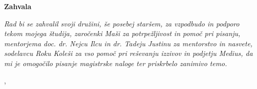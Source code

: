 \thispagestyle{empty}

\begin{center}
{\Large \textbf{\sc Zahvala}}
\end{center}
\vspace{0.5cm}

{\it\noindent
Rad bi se zahvalil svoji družini, še posebej staršem, za vzpodbudo in podporo tekom mojega študija, zaročenki Maši za potrpežljivost in pomoč pri pisanju, mentorjema doc. dr. Nejcu Ilcu in dr. Tadeju Justinu za mentorstvo in nasvete, sodelavcu Roku Koleši za vso pomoč pri reševanju izzivov in podjetju Medius, da mi je omogočilo pisanje magistrske naloge ter priskrbelo zanimivo temo.

\vspace{0.5cm} \hfill \tauthor, \myyear
}